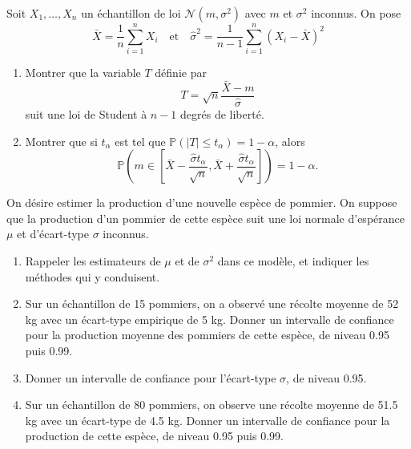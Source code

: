 \smallskip

\begin{mdframed}
\begin{exercice}
Soit $X_1, \dots, X_n$ un échantillon de loi $\mathcal{N}(m, \sigma^2)$ avec $m$ et $\sigma^2$ inconnus. On pose
\begin{equation*}
\bar{X} = \frac{1}{n}\sum_{i=1}^n X_i \quad \text{et} \quad \hat{\sigma}^2 = \frac{1}{n-1}\sum_{i=1}^n (X_i - \bar{X})^2
\end{equation*}

\begin{enumerate}
    \item Montrer que la variable $T$ définie par
    \begin{equation*}
    T = \sqrt{n} \frac{\bar{X} - m}{\hat{\sigma}}
    \end{equation*}
    suit une loi de Student à $n - 1$ degrés de liberté.
    \item Montrer que si $t_\alpha$ est tel que $\mathbb{P}(|T| \le t_\alpha) = 1 - \alpha$, alors
    \begin{equation*}
    \mathbb{P}\left( m \in \left[ \bar{X} - \frac{\hat{\sigma}t_\alpha}{\sqrt{n}}, \bar{X} + \frac{\hat{\sigma}t_\alpha}{\sqrt{n}} \right] \right) = 1 - \alpha.
    \end{equation*}
\end{enumerate}
\end{exercice}
\end{mdframed}

\smallskip

\begin{mdframed}
\begin{exercice}
On désire estimer la production d'une nouvelle espèce de pommier. On suppose que la production d'un pommier de cette espèce suit une loi normale d'espérance $\mu$ et d'écart-type $\sigma$ inconnus.

\begin{enumerate}
    \item Rappeler les estimateurs de $\mu$ et de $\sigma^2$ dans ce modèle, et indiquer les méthodes qui y conduisent.
    \item Sur un échantillon de 15 pommiers, on a observé une récolte moyenne de 52 kg avec un écart-type empirique de 5 kg. Donner un intervalle de confiance pour la production moyenne des pommiers de cette espèce, de niveau 0.95 puis 0.99.
    \item Donner un intervalle de confiance pour l'écart-type $\sigma$, de niveau 0.95.
    \item Sur un échantillon de 80 pommiers, on observe une récolte moyenne de 51.5 kg avec un écart-type de 4.5 kg. Donner un intervalle de confiance pour la production de cette espèce, de niveau 0.95 puis 0.99.
\end{enumerate}
\end{exercice}
\end{mdframed}